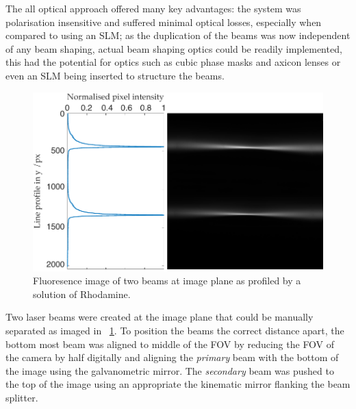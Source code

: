 The all optical approach offered many key advantages: the system was polarisation insensitive and suffered minimal optical losses, especially when compared to using an \gls{SLM}; as the duplication of the beams was now independent of any beam shaping, actual beam shaping optics could be readily implemented, this had the potential for optics such as cubic phase masks and axicon lenses or even an \gls{SLM} being inserted to structure the beams.

\begin{figure}
  \centering
  \includegraphics{dual_beam_profile}
  \caption{Fluoresence image of two beams at image plane as profiled by a solution of Rhodamine.}
  \label{fig:real_dual_beams}
\end{figure}
Two laser beams were created at the image plane that could be manually separated as imaged in \figurename~\ref{fig:real_dual_beams}.
To position the beams the correct distance apart, the bottom most beam was aligned to middle of the \gls{FOV} by reducing the \gls{FOV} of the camera by half digitally and aligning the \emph{primary} beam with the bottom of the image using the galvanometric mirror.
The \emph{secondary} beam was pushed to the top of the image using an appropriate the kinematic mirror flanking the beam splitter.
